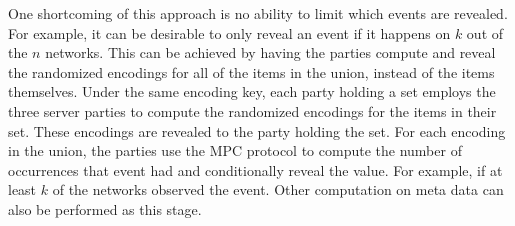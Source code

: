 One shortcoming of this approach is no ability to limit which events are revealed. For example, it can be desirable to only reveal an event if it happens on $k$ out of the $n$ networks. This can be achieved by having the parties compute and reveal the randomized encodings for all of the items in the union, instead of the items themselves. Under the same encoding key, each party holding a set employs the three server parties to compute the randomized encodings for the items in their set. These encodings are revealed to the party holding the set. For each encoding in the union, the parties use the MPC protocol to compute the number of occurrences that event had and conditionally reveal the value. For example, if at least $k$ of the networks observed the event. Other computation on meta data can also be performed as this stage.














